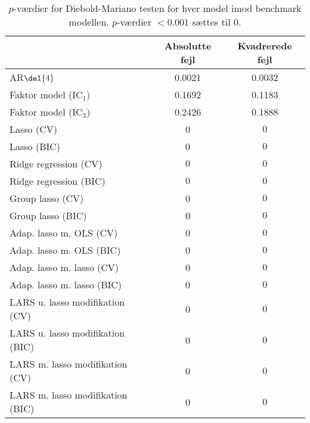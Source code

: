 \begin{table}[ht]
\center
\begin{tabular}{lcc}
\toprule
 & Absolutte fejl & Kvadrerede fejl \\ \midrule
AR\(\del{4}\) & 0.0021 & 0.0032 \\  
Faktor model (IC\(_1\)) & 0.1692 & 0.1183 \\
Faktor model (IC\(_3\)) & 0.2426 & 0.1888 \\
Lasso (CV) & 0 & $0$ \\
Lasso (BIC) & 0 & $0$ \\
Ridge regression (CV) & $0$  & $0$  \\
Ridge regression (BIC) &$0 $& $0$\\
Group lasso (CV) & 0 &$ 0$  \\
Group lasso (BIC) & 0& $0$ \\
Adap. lasso m. OLS (CV) & 0& $0 $\\
Adap. lasso m. OLS (BIC) & 0& $0$\\
Adap. lasso m. lasso (CV) & 0 & $0 $\\
Adap. lasso m. lasso (BIC) & 0& $0$\\
LARS u. lasso modifikation (CV) & 0 & $0$  \\
LARS u. lasso modifikation (BIC) & 0& $0$ \\
LARS m. lasso modifikation (CV) & 0& $0$ \\
LARS m. lasso modifikation (BIC) & 0& $0$ \\ \bottomrule
\end{tabular}
\caption{\(p\)-værdier for Diebold-Mariano testen for hver model imod benchmark modellen.
\(p\)-værdier \(< 0.001\) sættes til 0.} \label{tab:dm_test}
\end{table}
